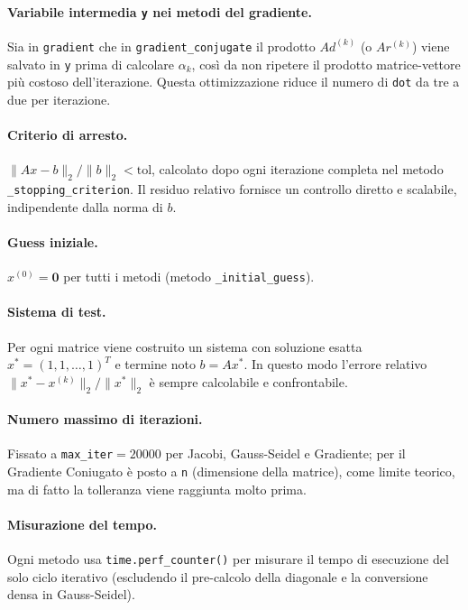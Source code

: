 \documentclass[a4paper,12pt]{article}
\begin{document}
\paragraph{Variabile intermedia \texttt{y} nei metodi del gradiente.}
Sia in \texttt{gradient} che in \texttt{gradient\_conjugate} il prodotto
$A d^{(k)}$ (o $A r^{(k)}$) viene salvato in \texttt{y} prima di calcolare
$\alpha_k$, così da non ripetere il prodotto matrice-vettore più costoso
dell'iterazione. Questa ottimizzazione riduce il numero di \texttt{dot} da
tre a due per iterazione.

\paragraph{Criterio di arresto.}
$\|Ax - b\|_2 / \|b\|_2 < \text{tol}$, calcolato dopo ogni iterazione completa nel metodo \texttt{\_stopping\_criterion}. Il residuo relativo fornisce un controllo diretto e scalabile, indipendente dalla norma di $b$.

\paragraph{Guess iniziale.}
$x^{(0)} = \mathbf{0}$ per tutti i metodi (metodo \texttt{\_initial\_guess}).

\paragraph{Sistema di test.}
Per ogni matrice viene costruito un sistema con soluzione esatta $x^* = (1,1,\dots,1)^T$ e termine noto $b = Ax^*$. In questo modo l'errore relativo $\|x^* - x^{(k)}\|_2 / \|x^*\|_2$ è sempre calcolabile e confrontabile.

\paragraph{Numero massimo di iterazioni.}
Fissato a \texttt{max\_iter}$= 20000$ per Jacobi, Gauss-Seidel e Gradiente; per il Gradiente Coniugato è posto a \texttt{n} (dimensione della matrice), come limite teorico, ma di fatto la tolleranza viene raggiunta molto prima.

\paragraph{Misurazione del tempo.}
Ogni metodo usa \texttt{time.perf\_counter()} per misurare il tempo di esecuzione del solo ciclo iterativo (escludendo il pre-calcolo della diagonale e la conversione densa in Gauss-Seidel).
\end{document}

